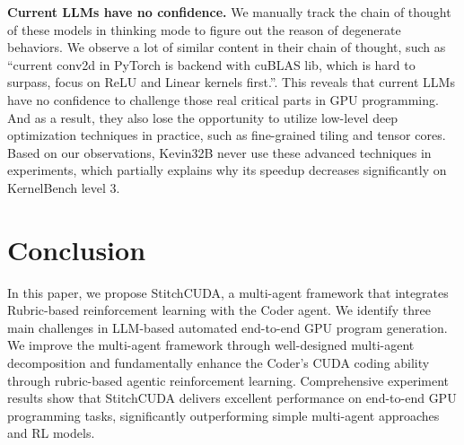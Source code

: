 \textbf{Current LLMs have no confidence.} We manually track the chain of thought of these models in thinking mode to figure out the reason of degenerate behaviors. We observe a lot of similar content in their chain of thought, such as “current conv2d in PyTorch is backend with cuBLAS lib, which is hard to surpass, focus on ReLU and Linear kernels first.”. This reveals that current LLMs have no confidence to challenge those real critical parts in GPU programming. And as a result, they also lose the opportunity to utilize low-level deep optimization techniques in practice, such as fine-grained tiling and tensor cores. Based on our observations, Kevin32B never use these advanced techniques in experiments, which partially explains why its speedup decreases significantly on KernelBench level 3. 





\section{Conclusion}
In this paper, we propose StitchCUDA, a multi-agent framework that integrates Rubric-based reinforcement learning with the Coder agent. We identify three main challenges in LLM-based automated end-to-end GPU program generation. We improve the multi-agent framework through well-designed multi-agent decomposition and fundamentally enhance the Coder's CUDA coding ability through rubric-based agentic reinforcement learning. Comprehensive experiment results show that StitchCUDA delivers excellent performance on end-to-end GPU programming tasks, significantly outperforming simple multi-agent approaches and RL models.